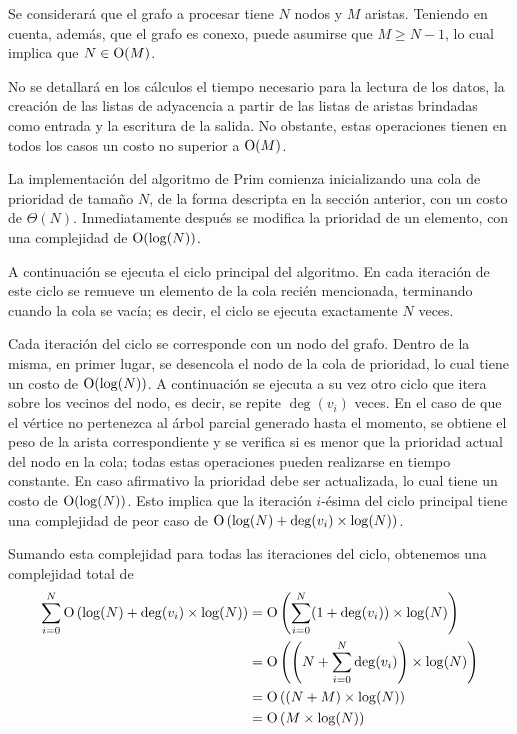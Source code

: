     Se considerará que el grafo a procesar tiene $N$ nodos y $M$ aristas.
    Teniendo en cuenta, además, que el grafo es conexo, puede asumirse que
    $M \geq N-1$, lo cual implica que $N \in \operatorname{O}(M)$.

    No se detallará en los cálculos el tiempo necesario para la lectura de
    los datos, la creación de las listas de adyacencia a partir de las listas
    de aristas brindadas como entrada y la escritura de la salida. No
    obstante, estas operaciones tienen en todos los casos un costo no
    superior a $\operatorname{O}(M)$.

    \vspace{1.25em}

    La implementación del algoritmo de Prim comienza inicializando una cola
    de prioridad de tamaño $N$, de la forma descripta en la sección anterior,
    con un costo de $\Theta(N)$. Inmediatamente después se modifica la
    prioridad de un elemento, con una complejidad de $\operatorname{O}(\log(N))$.

    A continuación se ejecuta el ciclo principal del algoritmo. En cada
    iteración de este ciclo se remueve un elemento de la cola recién
    mencionada, terminando cuando la cola se vacía; es decir, el ciclo se
    ejecuta exactamente $N$ veces.

    Cada iteración del ciclo se corresponde con un nodo del grafo. Dentro de
    la misma, en primer lugar, se desencola el nodo de la cola de prioridad,
    lo cual tiene un costo de $\operatorname{O}(\log(N))$. A continuación se ejecuta a su
    vez otro ciclo que itera sobre los vecinos del nodo, es decir, se repite
    $\operatorname{deg}(v_i)$ veces. En el caso de que el vértice no
    pertenezca al árbol parcial generado hasta el momento, se obtiene
    el peso de la arista correspondiente y se verifica si es menor
    que la prioridad actual del nodo en la cola; todas estas operaciones
    pueden realizarse en tiempo constante. En caso afirmativo la prioridad
    debe ser actualizada, lo cual tiene un costo de $\operatorname{O}(\log(N))$. Esto
    implica que la iteración $i$-ésima del ciclo principal tiene una
    complejidad de peor caso de
    $\operatorname{O} \left(\log(N) + \operatorname{deg}(v_i) \times \log(N) \right)$.

    Sumando esta complejidad para todas las iteraciones del ciclo, obtenemos
    una complejidad total de
    \[ \begin{aligned}
    \sum_{i=0}^{N} \operatorname{O} \left( \log(N) + \operatorname{deg}(v_i)
        \times \log(N) \right)
            &= \operatorname{O} \left( \sum_{i=0}^{N} (1+\operatorname{deg}(v_i))
                \times \log(N) \right) \\
            &= \operatorname{O} \left( \left( N + \sum_{i=0}^{N}
                \operatorname{deg}(v_i) \right) \times \log(N) \right) \\
            &= \operatorname{O} \left( (N + M) \times \log(N) \right) \\
            &= \operatorname{O} \left( M \times \log(N) \right)
    \end{aligned} \]

